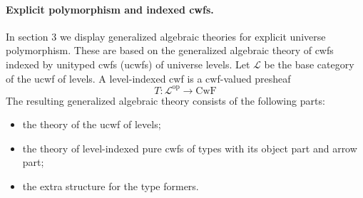 \documentclass[11pt,a4paper]{article}
\theoremstyle{definition}
\newcommand{\op}{\mathrm{op}}
\def\L{{\mathcal{L}}}
\def\CwF{\mathrm{CwF}}
\begin{document}
\paragraph{Explicit polymorphism and indexed cwfs.} In section 3 we display generalized algebraic theories for explicit universe polymorphism. These are based on the generalized algebraic theory of cwfs indexed by unityped cwfs (ucwfs) of universe levels. Let $\L$ be the base category of the ucwf of levels. A level-indexed cwf is a cwf-valued presheaf 
$$
T : \L^\op \to \CwF
$$
The resulting generalized algebraic theory consists of the following parts: \begin{itemize}
\item the theory of the ucwf of levels;
\item the theory of level-indexed pure cwfs of types with its object part and
arrow part;
\item the extra structure for the type formers.
\end{itemize}
\end{document}
